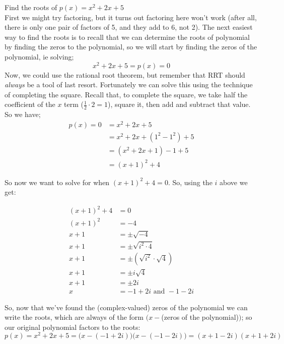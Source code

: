 \documentclass{ximera}
\begin{document}
    \begin{example}
        Find the roots of $p(x) = x^2 + 2x + 5$\\
        
        First we might try factoring, but it turns out factoring here won't work (after all, there is only one pair of factors of 5, and they add to 6, not 2). The next easiest way to find the roots is to recall that we can determine the roots of polynomial by finding the zeros to the polynomial, so we will start by finding the zeros of the polynomial, ie solving;
        \[
            x^2 + 2x + 5 = p(x) = 0
        \]
        Now, we could use the rational root theorem, but remember that RRT should \textit{always} be a tool of last resort. Fortunately we can solve this using the technique of completing the square. Recall that, to complete the square, we take half the coefficient of the $x$ term ($\frac{1}{2}\cdot 2 = 1$), square it, then add and subtract that value. So we have;
        \begin{align*}
            p(x) = 0    &= x^2 + 2x + 5                 \\
                        &= x^2 + 2x + (1^2 - 1^2) + 5   \\
                        &= (x^2 + 2x + 1) - 1 + 5       \\
                        &= (x+1)^2 + 4
        \end{align*}
        
        So now we want to solve for when $(x+1)^2 + 4 = 0$. So, using the $i$ above we get:
        
        \begin{align*}
            (x+1)^2 + 4 &= 0                                \\
            (x+1)^2     &= -4                               \\
            x+1         &= \pm \sqrt{-4}                    \\
            x + 1       &= \pm \sqrt{i^2 \cdot 4}           \\
            x + 1       &= \pm (\sqrt{i^2}\cdot \sqrt{4})   \\
            x + 1       &= \pm i\sqrt{4}                    \\
            x+1         &= \pm 2i                           \\
            x           &= -1 + 2i \text{ and } -1 - 2i 
        \end{align*}
        
        So, now that we've found the (complex-valued) zeros of the polynomial we can write the roots, which are always of the form $(x - $(zeros of the polynomial)$)$; so our original polynomial factors to the roots:
        \[
            p(x) = x^2 + 2x + 5 = \bigg(x- (-1 + 2i)\bigg)\bigg(x - (-1 - 2i)\bigg) = (x + 1 - 2i)(x + 1 + 2i)
        \]
    \end{example}%
    
\end{document}
